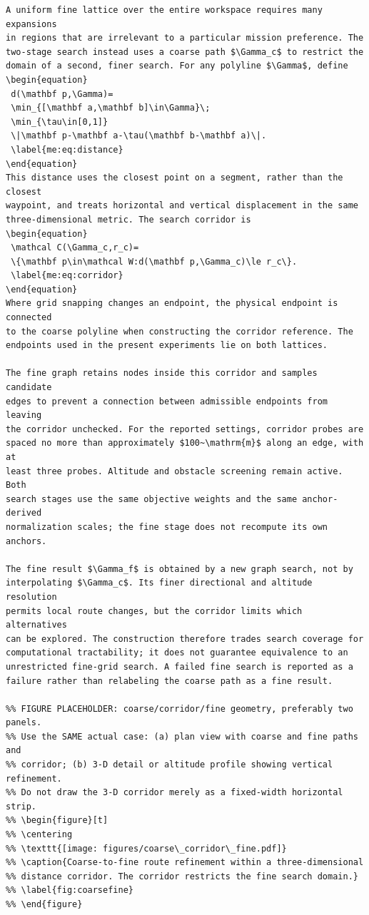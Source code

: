 \documentclass[12pt]{article}
\begin{document}
\begin{verbatim}
A uniform fine lattice over the entire workspace requires many expansions
in regions that are irrelevant to a particular mission preference. The
two-stage search instead uses a coarse path $\Gamma_c$ to restrict the
domain of a second, finer search. For any polyline $\Gamma$, define
\begin{equation}
 d(\mathbf p,\Gamma)=
 \min_{[\mathbf a,\mathbf b]\in\Gamma}\;
 \min_{\tau\in[0,1]}
 \|\mathbf p-\mathbf a-\tau(\mathbf b-\mathbf a)\|.
 \label{me:eq:distance}
\end{equation}
This distance uses the closest point on a segment, rather than the closest
waypoint, and treats horizontal and vertical displacement in the same
three-dimensional metric. The search corridor is
\begin{equation}
 \mathcal C(\Gamma_c,r_c)=
 \{\mathbf p\in\mathcal W:d(\mathbf p,\Gamma_c)\le r_c\}.
 \label{me:eq:corridor}
\end{equation}
Where grid snapping changes an endpoint, the physical endpoint is connected
to the coarse polyline when constructing the corridor reference. The
endpoints used in the present experiments lie on both lattices.

The fine graph retains nodes inside this corridor and samples candidate
edges to prevent a connection between admissible endpoints from leaving
the corridor unchecked. For the reported settings, corridor probes are
spaced no more than approximately $100~\mathrm{m}$ along an edge, with at
least three probes. Altitude and obstacle screening remain active. Both
search stages use the same objective weights and the same anchor-derived
normalization scales; the fine stage does not recompute its own anchors.

The fine result $\Gamma_f$ is obtained by a new graph search, not by
interpolating $\Gamma_c$. Its finer directional and altitude resolution
permits local route changes, but the corridor limits which alternatives
can be explored. The construction therefore trades search coverage for
computational tractability; it does not guarantee equivalence to an
unrestricted fine-grid search. A failed fine search is reported as a
failure rather than relabeling the coarse path as a fine result.

%% FIGURE PLACEHOLDER: coarse/corridor/fine geometry, preferably two panels.
%% Use the SAME actual case: (a) plan view with coarse and fine paths and
%% corridor; (b) 3-D detail or altitude profile showing vertical refinement.
%% Do not draw the 3-D corridor merely as a fixed-width horizontal strip.
%% \begin{figure}[t]
%% \centering
%% \texttt{[image: figures/coarse\_corridor\_fine.pdf]}
%% \caption{Coarse-to-fine route refinement within a three-dimensional
%% distance corridor. The corridor restricts the fine search domain.}
%% \label{fig:coarsefine}
%% \end{figure}


\end{verbatim}
\end{document}
